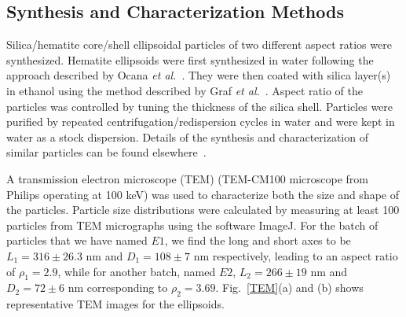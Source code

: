 \documentclass[aps,prl,preprint,superscriptaddress,showkeys]{revtex4-2} %
\begin{document}
\subsection{Synthesis and Characterization Methods}
Silica/hematite core/shell ellipsoidal particles of two different aspect ratios were synthesized. Hematite ellipsoids were first synthesized in water following the approach described by Ocana \emph{et al.}~\cite{ocana1999homogeneous}. They were then coated with silica layer(s) in ethanol using the method described by Graf \emph{et al.}~\cite{graf2003general}. Aspect ratio of the particles was controlled by tuning the thickness of the silica shell. Particles were purified by repeated centrifugation/redispersion cycles in water and were kept in water as a stock dispersion. Details of the synthesis and characterization of similar particles can be found elsewhere~\cite{reufer2010morphology}.\par
A transmission electron microscope (TEM) (TEM-CM100 microscope from Philips operating at 100 keV) was used to characterize both the size and shape of the particles. Particle size distributions were calculated by measuring at least 100 particles from TEM micrographs using the software ImageJ. For the batch of particles that we have named $E1$, we find the long and short axes to be $L_1 = 316\pm 26.3$ nm and $D_1 = 108 \pm 7$ nm respectively, leading to an aspect ratio of $\rho_1 = 2.9$, while for another batch, named $E2$, $L_2 = 266 \pm 19$ nm and $D_2 = 72 \pm 6$ nm corresponding to $\rho_2 = 3.69$. Fig.~\ref{TEM}(a) and (b) shows representative TEM images for the ellipsoids.
\end{document}
